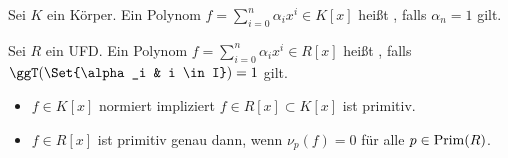 \begin{df} \label{15.3-7}
	Sei $K$ ein Körper.
	Ein Polynom $f = \sum_{i=0}^n \alpha_i x^i \in K[x]$ heißt , falls $\alpha_n = 1$ gilt.

	Sei $R$ ein UFD.
	Ein Polynom $f = \sum_{i=0}^n \alpha_i x^i \in R[x]$ heißt , falls $\ggT(\Set{\alpha_i & i \in I}) = 1$ gilt.
	\begin{note}
		\begin{itemize}
			\item
				$f \in K[x]$ normiert impliziert $f \in R[x] \subset K[x]$ ist primitiv.
			\item
				$f \in R[x]$ ist primitiv genau dann, wenn $\nu_p(f) = 0$ für alle $p \in \operatorname{Prim}(R)$.
		\end{itemize}
	\end{note}
\end{df}

